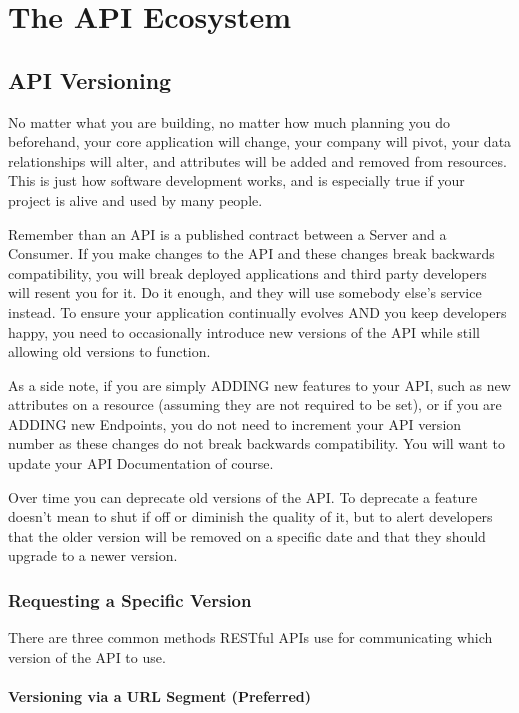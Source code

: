 \documentclass{book}
\begin{document}
\chapter{The API Ecosystem}

\section{API Versioning}

No matter what you are building, no matter how much planning you do beforehand, your core application will change, your company will pivot, your data relationships will alter, and attributes will be added and removed from resources. This is just how software development works, and is especially true if your project is alive and used by many people.

Remember than an API is a published contract between a Server and a Consumer. If you make changes to the API and these changes break backwards compatibility, you will break deployed applications and third party developers will resent you for it. Do it enough, and they will use somebody else's service instead. To ensure your application continually evolves AND you keep developers happy, you need to occasionally introduce new versions of the API while still allowing old versions to function.

As a side note, if you are simply ADDING new features to your API, such as new attributes on a resource (assuming they are not required to be set), or if you are ADDING new Endpoints, you do not need to increment your API version number as these changes do not break backwards compatibility. You will want to update your API Documentation of course.

Over time you can deprecate old versions of the API. To deprecate a feature doesn't mean to shut if off or diminish the quality of it, but to alert developers that the older version will be removed on a specific date and that they should upgrade to a newer version.

\subsection{Requesting a Specific Version}

There are three common methods RESTful APIs use for communicating which version of the API to use.

\subsubsection{Versioning via a URL Segment (Preferred)}
\end{document}
